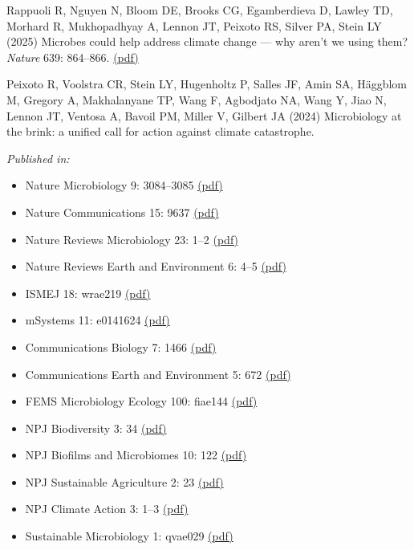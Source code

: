 \documentclass[11pt]{article}
\begin{document}
\begin{etaremune}
\item Rappuoli R, Nguyen N, Bloom DE, Brooks CG, Egamberdieva D, Lawley TD, Morhard R, Mukhopadhyay A, Lennon JT, Peixoto RS, Silver PA, Stein LY (2025) Microbes could help address climate change — why aren’t we using them? \textit{Nature} 639: 864–866. \href{https://lennonlab.github.io/assets/publications/Rappuoli_etal_2025a.pdf}{(pdf)}

\item Peixoto R, Voolstra CR, Stein LY, Hugenholtz P, Salles JF, Amin SA, Häggblom M, Gregory A, Makhalanyane TP, Wang F, Agbodjato NA, Wang Y, Jiao N, Lennon JT, Ventosa A, Bavoil PM, Miller V, Gilbert JA (2024) Microbiology at the brink: a unified call for action against climate catastrophe. 

\textit{Published in:}
\begin{itemize}
  \item Nature Microbiology 9: 3084–3085 \href{https://lennonlab.github.io/assets/publications/Peixoto_etal_2024a.pdf}{(pdf)}
  \item Nature Communications 15: 9637 \href{https://lennonlab.github.io/assets/publications/Peixoto_etal_2024b.pdf}{(pdf)}
  \item Nature Reviews Microbiology 23: 1–2 \href{https://lennonlab.github.io/assets/publications/Peixoto_etal_2024c.pdf}{(pdf)}
  \item Nature Reviews Earth and Environment 6: 4–5 \href{https://lennonlab.github.io/assets/publications/Peixoto_etal_2024d.pdf}{(pdf)}
  \item ISMEJ 18: wrae219 \href{https://lennonlab.github.io/assets/publications/Peixoto_etal_2024e.pdf}{(pdf)}
  \item mSystems 11: e0141624 \href{https://lennonlab.github.io/assets/publications/Peixoto_etal_2024f.pdf}{(pdf)}
  \item Communications Biology 7: 1466 \href{https://lennonlab.github.io/assets/publications/Peixoto_etal_2024g.pdf}{(pdf)}
  \item Communications Earth and Environment 5: 672 \href{https://lennonlab.github.io/assets/publications/Peixoto_etal_2024h.pdf}{(pdf)}
  \item FEMS Microbiology Ecology 100: fiae144 \href{https://lennonlab.github.io/assets/publications/Peixoto_etal_2024i.pdf}{(pdf)}
  \item NPJ Biodiversity 3: 34 \href{https://lennonlab.github.io/assets/publications/Peixoto_etal_2024j.pdf}{(pdf)}
  \item NPJ Biofilms and Microbiomes 10: 122 \href{https://lennonlab.github.io/assets/publications/Peixoto_etal_2024k.pdf}{(pdf)}
  \item NPJ Sustainable Agriculture 2: 23 \href{https://lennonlab.github.io/assets/publications/Peixoto_etal_2024l.pdf}{(pdf)}
  \item NPJ Climate Action 3: 1–3 \href{https://lennonlab.github.io/assets/publications/Peixoto_etal_2024m.pdf}{(pdf)}
  \item Sustainable Microbiology 1: qvae029 \href{https://lennonlab.github.io/assets/publications/Peixoto_etal_2024n.pdf}{(pdf)}
\end{itemize}


\end{etaremune}
\end{document}
